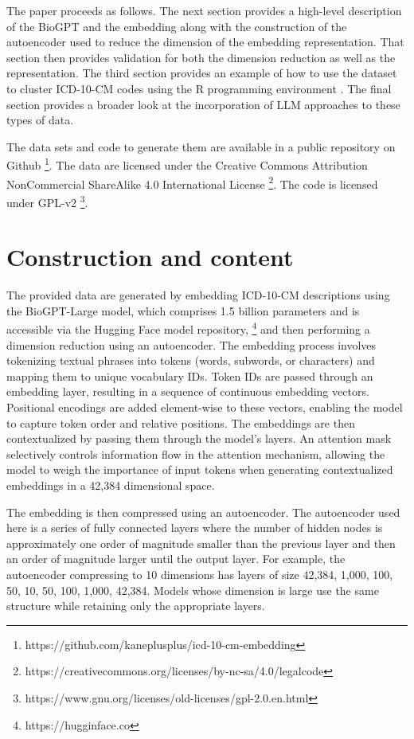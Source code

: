 \documentclass{bmcart}
\begin{document}
The paper proceeds as follows. The next section provides a high-level 
description of the BioGPT and the embedding along with the construction of 
the autoencoder used to reduce the dimension of the embedding representation. 
That section then provides validation for both the dimension reduction as well 
as the representation. The third section provides an example of how to use the 
dataset to cluster ICD-10-CM codes using the R programming environment 
\cite{rcore}. The final section provides a broader look at the
incorporation of LLM approaches to these types of data.

The data sets and code to generate them are available in a public
repository on Github 
\footnote{https://github.com/kaneplusplus/icd-10-cm-embedding}. 
The data are licensed under the Creative Commons Attribution NonCommercial 
ShareAlike 4.0 International License 
\footnote{https://creativecommons.org/licenses/by-nc-sa/4.0/legalcode}. 
The code is licensed under GPL-v2
\footnote{https://www.gnu.org/licenses/old-licenses/gpl-2.0.en.html}.

\section*{Construction and content}

The provided data are generated by embedding ICD-10-CM descriptions using the 
BioGPT-Large model, which comprises 1.5 billion parameters and is accessible 
via the Hugging Face model repository, \footnote{https://hugginface.co} and
then performing a dimension reduction using an autoencoder. 
The embedding process involves tokenizing 
textual phrases into tokens (words, subwords, or characters) and mapping them 
to unique vocabulary IDs. Token IDs are passed through an embedding layer, 
resulting in a sequence of continuous embedding vectors. Positional encodings 
are added element-wise to these vectors, enabling the model to capture token 
order and relative positions. The embeddings are then contextualized by 
passing them through the model's layers. An attention mask selectively 
controls information flow in the attention mechanism, allowing the model to 
weigh the importance of input tokens when generating contextualized embeddings 
in a 42,384 dimensional space.

The embedding is then compressed using an autoencoder. The autoencoder used
here is 
a series of fully connected layers where the number of hidden nodes is 
approximately one order of magnitude smaller than the previous layer and then 
an order of magnitude larger until the output layer.  For example, the 
autoencoder compressing to 10 dimensions has layers of size 42,384, 1,000,
100, 50, 10, 50, 100, 1,000, 42,384. Models whose dimension is large use 
the same structure while retaining only the appropriate layers.
\end{document}
